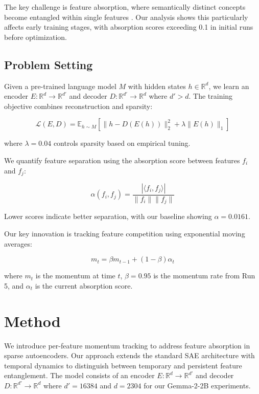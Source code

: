 \documentclass{article} %
\begin{document}
The key challenge is feature absorption, where semantically distinct concepts become entangled within single features \cite{chaninAbsorptionStudyingFeature2024}. Our analysis shows this particularly affects early training stages, with absorption scores exceeding 0.1 in initial runs before optimization.

\subsection{Problem Setting}
\label{subsec:problem}

Given a pre-trained language model $M$ with hidden states $h \in \mathbb{R}^d$, we learn an encoder $E: \mathbb{R}^d \rightarrow \mathbb{R}^{d'}$ and decoder $D: \mathbb{R}^{d'} \rightarrow \mathbb{R}^d$ where $d' > d$. The training objective combines reconstruction and sparsity:

\begin{equation}
\mathcal{L}(E,D) = \mathbb{E}_{h \sim M}[\|h - D(E(h))\|_2^2 + \lambda\|E(h)\|_1]
\end{equation}

where $\lambda=0.04$ controls sparsity based on empirical tuning.

We quantify feature separation using the absorption score between features $f_i$ and $f_j$:

\begin{equation}
\alpha(f_i, f_j) = \frac{|\langle f_i, f_j \rangle|}{\|f_i\|\|f_j\|}
\end{equation}

Lower scores indicate better separation, with our baseline showing $\alpha=0.0161$.

Our key innovation is tracking feature competition using exponential moving averages:

\begin{equation}
m_t = \beta m_{t-1} + (1-\beta)\alpha_t
\end{equation}

where $m_t$ is the momentum at time $t$, $\beta=0.95$ is the momentum rate from Run 5, and $\alpha_t$ is the current absorption score.

\section{Method}
\label{sec:method}

We introduce per-feature momentum tracking to address feature absorption in sparse autoencoders. Our approach extends the standard SAE architecture \cite{gaoScalingEvaluatingSparse} with temporal dynamics to distinguish between temporary and persistent feature entanglement. The model consists of an encoder $E: \mathbb{R}^d \rightarrow \mathbb{R}^{d'}$ and decoder $D: \mathbb{R}^{d'} \rightarrow \mathbb{R}^d$ where $d'=16384$ and $d=2304$ for our Gemma-2-2B experiments.
\end{document}
